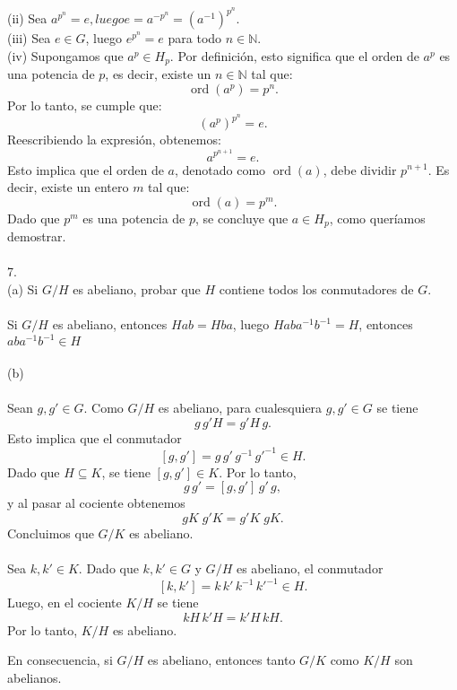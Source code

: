 \documentclass{article}
\begin{document}
(ii) Sea $a^{p^{n}}=e, luego e=a^{-p^{n}}=(a^{-1})^{p^{n}}$.
\\
(iii) Sea $e \in G$, luego $e^{p^{n}}=e$ para todo $n \in \mathbb{N}$.
\\
(iv) Supongamos que $a^p \in H_p$. Por definición, esto significa que el orden de $a^p$ es una potencia de $p$, es decir, existe un $n \in \mathbb{N}$ tal que:
\[
\operatorname{ord}(a^p) = p^n.
\]
Por lo tanto, se cumple que:
\[
(a^p)^{p^n} = e.
\]
Reescribiendo la expresión, obtenemos:
\[
a^{p^{n+1}} = e.
\]
Esto implica que el orden de $a$, denotado como $\operatorname{ord}(a)$, debe dividir $p^{n+1}$. Es decir, existe un entero $m$ tal que:
\[
\operatorname{ord}(a) = p^m.
\]
Dado que $p^m$ es una potencia de $p$, se concluye que $a \in H_p$, como queríamos demostrar.
\\
\\
7.
\\
(a) Si $G/H$ es abeliano, probar que $H$ contiene todos los conmutadores de $G$.
\\
\\
Si $G/H$ es abeliano, entonces $Hab=Hba$, luego $Haba^{-1}b^{-1}=H$, entonces $aba^{-1}b^{-1} \in H$
\\
\\
(b)
\\
\\
Sean $g,g'\in G$. Como $G/H$ es abeliano, para cualesquiera $g,g'\in G$ se tiene
\[
g\,g'H = g'H\,g.
\]
Esto implica que el conmutador
\[
[g,g'] = g\,g'\,g^{-1}\,g'^{-1} \in H.
\]
Dado que $H\subseteq K$, se tiene $[g,g']\in K$. Por lo tanto,
\[
g\,g' = [g,g']\,g'\,g,
\]
y al pasar al cociente obtenemos
\[
gK\;g'K = g'K\;gK.
\]
Concluimos que $G/K$ es abeliano.
\\
\\
Sea $k,k'\in K$. Dado que $k,k'\in G$ y $G/H$ es abeliano, el conmutador
\[
[k,k'] = k\,k'\,k^{-1}\,k'^{-1} \in H.
\]
Luego, en el cociente $K/H$ se tiene
\[
kH\,k'H = k'H\,kH.
\]
Por lo tanto, $K/H$ es abeliano.

\medskip

En consecuencia, si $G/H$ es abeliano, entonces tanto $G/K$ como $K/H$ son abelianos.
\end{document}
